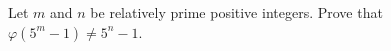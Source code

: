 Let $m$ and $n$ be relatively prime positive integers. Prove that $\varphi\left(5^m-1\right)\neq5^n-1$.